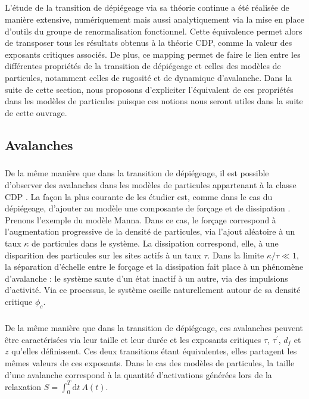 \subparagraph{}L'étude de la transition de dépiégeage via sa théorie continue a été réalisée de manière extensive, numériquement mais aussi analytiquement via la mise en place d'outils du groupe de renormalisation fonctionnel. Cette équivalence permet alors de transposer tous les résultats obtenus à la théorie CDP, comme la valeur des exposants critiques associés. De plus, ce mapping permet de faire le lien entre les différentes propriétés de la transition de dépiégeage et celles des modèles de particules, notamment celles de rugosité et de dynamique d'avalanche. Dans la suite de cette section, nous proposons d'expliciter l'équivalent de ces propriétés dans les modèles de particules puisque ces notions nous seront utiles dans la suite de cette ouvrage.

\subsection{Avalanches}

\label{sec:IntroAvalanches}

\subparagraph{}De la même manière que dans la transition de dépiégeage, il est possible d'observer des avalanches dans les modèles de particules appartenant à la classe CDP \cite{lubeck_moment_2000, dickman_paths_2000}. La façon la plus courante de les étudier est, comme dans le cas du dépiégeage, d'ajouter au modèle une composante de forçage et de dissipation \cite{lubeck_universal_2004}. Prenons l'exemple du modèle Manna. Dans ce cas, le forçage correspond à l'augmentation progressive de la densité de particules, via l'ajout aléatoire à un taux $\kappa$ de particules dans le système. La dissipation correspond, elle, à une disparition des particules sur les sites actifs à un taux $\tau$. Dans la limite $\kappa/\tau \ll 1$, la séparation d'échelle entre le forçage et la dissipation fait place à un phénomène d'avalanche : le système saute d'un état inactif à un autre, via des impulsions d'activité. Via ce processus, le système oscille naturellement autour de sa densité critique $\phi_c$.

\subparagraph{}De la même manière que dans la transition de dépiégeage, ces avalanches peuvent être caractérisées via leur taille et leur durée et les exposants critiques $\tau$, $\tau^\prime$, $d_f$ et $z$ qu'elles définissent. Ces deux transitions étant équivalentes, elles partagent les mêmes valeurs de ces exposants. Dans le cas des modèles de particules, la taille d'une avalanche correspond à la quantité d'activations générées lors de la relaxation $S = \int_0^T \mathrm{d}t~ A(t)$.

